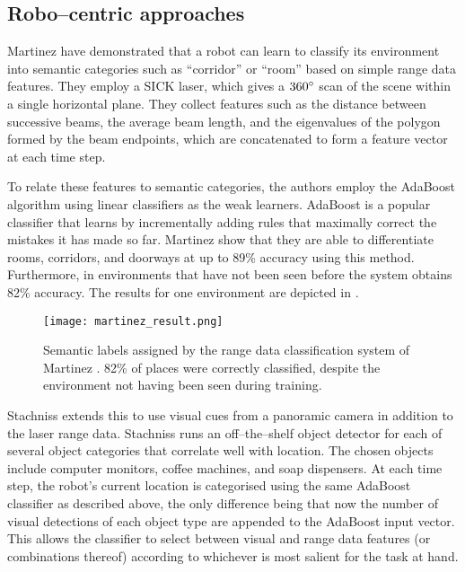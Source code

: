 \subsection{Robo--centric approaches}
Martinez \etal \cite{Mozos05} have demonstrated that a robot can learn
to classify its environment into semantic categories such as
``corridor'' or ``room'' based on simple range data features. They
employ a SICK laser, which gives a $360\degrees$ scan of the scene
within a single horizontal plane. They collect features such as the
distance between successive beams, the average beam length, and the
eigenvalues of the polygon formed by the beam endpoints, which are
concatenated to form a feature vector at each time step.

To relate these features to semantic categories, the authors employ
the AdaBoost algorithm \cite{Schapire98} using linear classifiers as
the weak learners. AdaBoost is a popular classifier that learns by
incrementally adding rules that maximally correct the mistakes it has
made so far. Martinez \etal show that they are able to differentiate
rooms, corridors, and doorways at up to 89\% accuracy using this
method. Furthermore, in environments that have not been seen before
the system obtains 82\% accuracy. The results for one environment are
depicted in .\\

\begin{figure}[htp]
\centering
\texttt{[image: martinez\_result.png]}
\caption{Semantic labels assigned by the range data classification
  system of Martinez \etal \cite{Mozos05}. 82\% of places were
  correctly classified, despite the environment not having been seen
  during training.}
\label{fig:martinez-result}
\end{figure}

Stachniss \etal \cite{Stachniss05} extends this to use visual cues
from a panoramic camera in addition to the laser range data. Stachniss
runs an off--the--shelf object detector for each of several object
categories that correlate well with location. The chosen objects
include computer monitors, coffee machines, and soap dispensers. At
each time step, the robot's current location is categorised using the
same AdaBoost classifier as described above, the only difference being
that now the number of visual detections of each object type are
appended to the AdaBoost input vector. This allows the classifier to
select between visual and range data features (or combinations
thereof) according to whichever is most salient for the task at hand.

